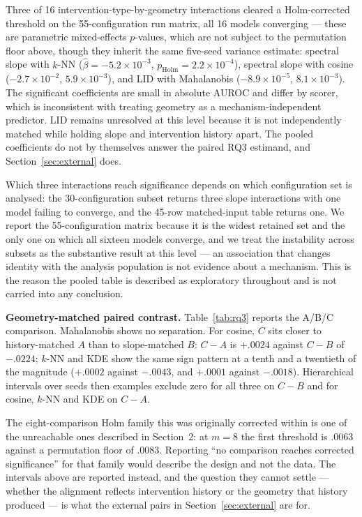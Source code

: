 \documentclass[11pt,a4paper]{article}
\begin{document}
Three of 16 intervention-type-by-geometry interactions cleared a Holm-corrected threshold on the 55-configuration run matrix, all 16 models converging --- these are parametric mixed-effects $p$-values, which are not subject to the permutation floor above, though they inherit the same five-seed variance estimate: spectral slope with $k$-NN ($\hat\beta=-5.2\times10^{-3}$, $p_{\mathrm{Holm}}=2.2\times10^{-4}$), spectral slope with cosine ($-2.7\times10^{-2}$, $5.9\times10^{-3}$), and LID with Mahalanobis ($-8.9\times10^{-5}$, $8.1\times10^{-3}$). The significant coefficients are small in absolute AUROC and differ by scorer, which is inconsistent with treating geometry as a mechanism-independent predictor. LID remains unresolved at this level because it is not independently matched while holding slope and intervention history apart. The pooled coefficients do not by themselves answer the paired RQ3 estimand, and Section~\ref{sec:external} does.

Which three interactions reach significance depends on which configuration set is analysed: the 30-configuration subset returns three slope interactions with one model failing to converge, and the 45-row matched-input table returns one. We report the 55-configuration matrix because it is the widest retained set and the only one on which all sixteen models converge, and we treat the instability across subsets as the substantive result at this level --- an association that changes identity with the analysis population is not evidence about a mechanism. This is the reason the pooled table is described as exploratory throughout and is not carried into any conclusion.

\textbf{Geometry-matched paired contrast.} Table~\ref{tab:rq3} reports the A/B/C comparison. Mahalanobis shows no separation. For cosine, $C$ sits closer to history-matched $A$ than to slope-matched $B$: $C-A$ is $+.0024$ against $C-B$ of $-.0224$; $k$-NN and KDE show the same sign pattern at a tenth and a twentieth of the magnitude ($+.0002$ against $-.0043$, and $+.0001$ against $-.0018$). Hierarchical intervals over seeds then examples exclude zero for all three on $C-B$ and for cosine, $k$-NN and KDE on $C-A$.

The eight-comparison Holm family this was originally corrected within is one of the unreachable ones described in Section~2: at $m=8$ the first threshold is $.0063$ against a permutation floor of $.0083$. Reporting ``no comparison reaches corrected significance'' for that family would describe the design and not the data. The intervals above are reported instead, and the question they cannot settle --- whether the alignment reflects intervention history or the geometry that history produced --- is what the external pairs in Section~\ref{sec:external} are for.
\end{document}

